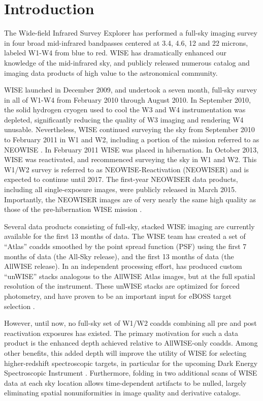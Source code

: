 \documentclass{emulateapj}
\begin{document}
\section{Introduction}

The Wide-field Infrared Survey Explorer \cite[WISE; ][]{wright10} has performed
a full-sky imaging survey in four broad mid-infrared bandpasses centered at 
3.4, 4.6, 12 and 22 microns, labeled W1-W4 from blue to red. WISE has 
dramatically enhanced our knowledge of the mid-infrared sky, and publicly 
released numerous catalog and imaging data products of high value to the 
astronomical community.

WISE launched in December 2009, and undertook a seven 
month, full-sky survey in all of W1-W4 from February 2010 through August
2010. In September 2010, the solid hydrogen cryogen used to cool the W3 and W4 
instrumentation was depleted, significantly reducing the quality of W3 
imaging and rendering W4 unusable. Nevertheless, WISE continued surveying 
the sky from September 2010 to February 2011 in W1 and W2, including 
a portion of the mission referred to as NEOWISE \citep{neowise}. In February 
2011 WISE was placed in hibernation. In October 2013, WISE was reactivated, and
recommenced surveying the sky in W1 and W2. This W1/W2 survey is referred to as 
NEOWISE-Reactivation (NEOWISER) and is expected to continue until 2017. The
first-year NEOWISER data products, including all single-exposure images,
were publicly released in March 2015. Importantly, the NEOWISER images are of 
very nearly the same high quality as those of the pre-hibernation WISE mission
\citep{neowiser}.

Several data products consisting of full-sky, stacked WISE imaging are 
currently available for the first 13 months of data. The WISE team has created 
a set of ``Atlas'' coadds smoothed by the point spread function (PSF) using the
first 7 months of data (the All-Sky release), and the first 13 months of data 
(the AllWISE release). In an independent processing effort, \cite{lang14} has 
produced custom ``unWISE'' stacks analogous to the AllWISE Atlas images, but at
the full spatial resolution of the instrument. These unWISE stacks are 
optimized for forced photometry, and have proven to be an important input for 
eBOSS target selection \citep{lang14b, eboss_qso, eboss_lrg}.

However, until now, no full-sky set of W1/W2 coadds combining all pre and post 
reactivation exposures has existed. The primary motivation for such a
data product is the enhanced depth achieved relative to AllWISE-only coadds. 
Among other benefits, this added depth will improve the utility of WISE for 
selecting higher-redshift spectroscopic targets, in particular for the upcoming
Dark Energy Spectroscopic Instrument \citep[DESI,][]{desi}. Furthermore, 
folding in two additional scans of WISE data at each sky location allows
time-dependent artifacts to be nulled, largely eliminating spatial 
nonuniformities in image quality and derivative catalogs.
\end{document}
